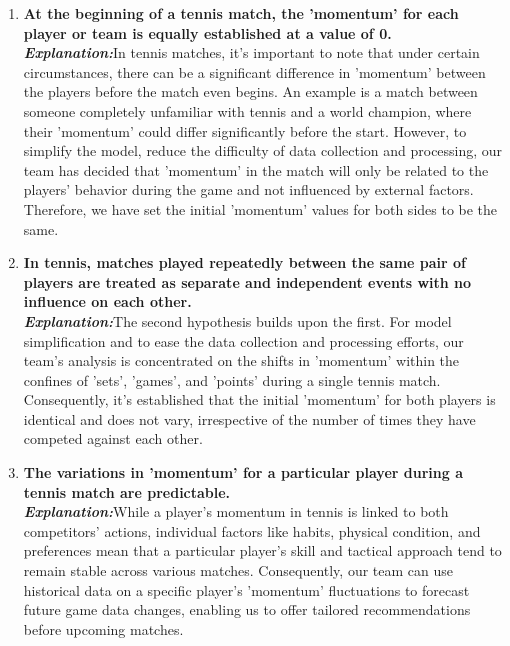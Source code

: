 \documentclass[12pt]{article}  %
\begin{document}
\begin{enumerate}
	\item \textbf{At the beginning of a tennis match, the 'momentum' for each player or team is equally established at a value of 0.}\\
	\textbf{\textit{Explanation:}}In tennis matches, it's important to note that under certain circumstances, 
    there can be a significant difference in 'momentum' between the players before the match even begins. 
    An example is a match between someone completely unfamiliar with tennis and a world champion, 
    where their 'momentum' could differ significantly before the start. However, to simplify the model, 
    reduce the difficulty of data collection and processing, 
    our team has decided that 'momentum' in the match will only be related to the players' behavior during the game and not influenced 
    by external factors. 
    Therefore, we have set the initial 'momentum' values for both sides to be the same.
	\item \textbf{In tennis, matches played repeatedly between the same pair of players are treated as separate and independent events with no influence on each other.}\\
	\textbf{\textit{Explanation:}}The second hypothesis builds upon the first. 
    For model simplification and to ease the data collection and processing efforts, 
    our team's analysis is concentrated on the shifts in 'momentum' within the confines of 'sets', 'games', and 'points' 
    during a single tennis match. Consequently, it's established that the initial 'momentum' for both players is identical and does not vary, 
    irrespective of the number of times they have competed against each other.
	\item \textbf{The variations in 'momentum' for a particular player during a tennis match are predictable.}\\
	\textbf{\textit{Explanation:}}While a player's momentum in tennis is linked to both competitors' actions, 
    individual factors like habits, physical condition, 
    and preferences mean that a particular player's skill and tactical approach tend to remain stable across various matches. 
    Consequently, our team can use historical data on a specific player's 'momentum' fluctuations to forecast future game data changes, 
    enabling us to offer tailored recommendations before upcoming matches.
\end{enumerate}
\end{document}
